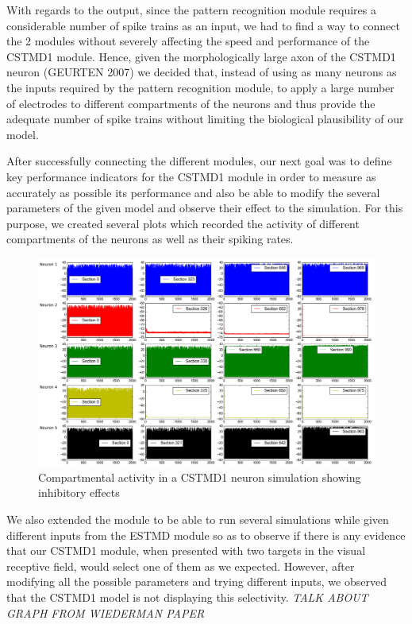 \documentclass[a4paper,11pt]{article}
\begin{document}
With regards to the output, since the pattern recognition module requires a considerable number of spike trains as an input, we had to find a way to connect the 2 modules without severely affecting the speed and performance of the CSTMD1 module. Hence, given the morphologically large axon of the CSTMD1 neuron (GEURTEN 2007) we decided that, instead of using as many neurons as the inputs required by the pattern recognition module, to apply a large number of electrodes to different compartments of the neurons and thus provide the adequate number of spike trains without limiting the biological plausibility of our model.

After successfully connecting the different modules, our next goal was to define key performance indicators for the CSTMD1 module in order to measure as accurately as possible its performance and also be able to modify the several parameters of the given model and observe their effect to the simulation. For this purpose, we created several plots which recorded the activity of different compartments of the neurons as well as their spiking rates. 

\begin{figure}[h]
\centering
\includegraphics[scale = 0.3]{compartments}
\caption{Compartmental activity in a CSTMD1 neuron simulation showing inhibitory effects}
\end{figure}

We also extended the module to be able to run several simulations while given different inputs from the ESTMD module so as to observe if there is any evidence that our CSTMD1 module, when presented with two targets in the visual receptive field, would select one of them as we expected. However, after modifying all the possible parameters and trying different inputs, we observed that the CSTMD1 model is not displaying this selectivity. \emph{\color{red}TALK ABOUT GRAPH FROM WIEDERMAN PAPER}
\end{document}
